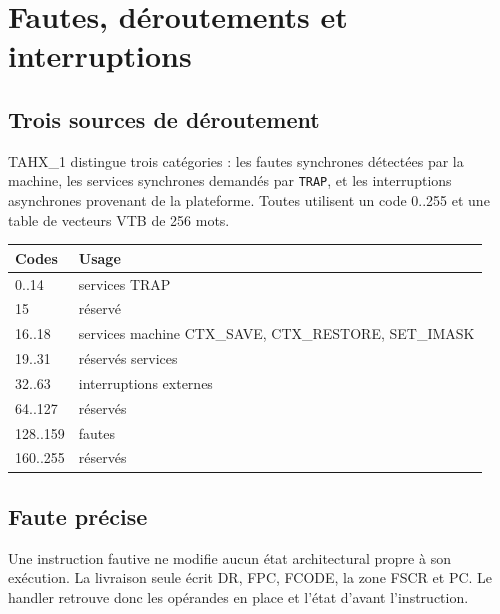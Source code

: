 \documentclass[10pt,a4paper,twoside,openany]{book}
\newcommand{\reg}[1]{\textsc{#1}}
\begin{document}
\chapter{Fautes, déroutements et interruptions}
\section{Trois sources de déroutement}
TAHX\_1 distingue trois catégories : les fautes synchrones détectées par la machine, les services synchrones demandés par \texttt{TRAP}, et les interruptions asynchrones provenant de la plateforme. Toutes utilisent un code 0..255 et une table de vecteurs \reg{VTB} de 256 mots.

\begin{center}
\begin{tabularx}{\linewidth}{@{}lX@{}}
\toprule
Codes & Usage\\ \midrule
0..14 & services TRAP\\
15 & réservé\\
16..18 & services machine CTX\_SAVE, CTX\_RESTORE, SET\_IMASK\\
19..31 & réservés services\\
32..63 & interruptions externes\\
64..127 & réservés\\
128..159 & fautes\\
160..255 & réservés\\
\bottomrule
\end{tabularx}
\end{center}

\section{Faute précise}
Une instruction fautive ne modifie aucun état architectural propre à son exécution. La livraison seule écrit \reg{DR}, \reg{FPC}, \reg{FCODE}, la zone \reg{FSCR} et \reg{PC}. Le handler retrouve donc les opérandes en place et l'état d'avant l'instruction.

\begin{center}
\end{center}
\end{document}
